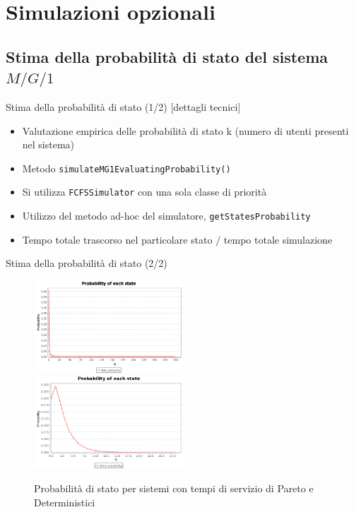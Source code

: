 \documentclass[slidestop,compress,mathserif]{beamer}
\begin{document}
\section{Simulazioni opzionali}
\subsection{Stima della probabilit\`a di stato del sistema $M/G/1$}
\begin{frame}{Stima della probabilit\`a di stato (1/2) [dettagli tecnici]}
\vfill
\begin{itemize}
	\item Valutazione empirica delle probabilit\`a di stato k (numero di utenti presenti nel sistema)
	\item Metodo {\tt simulateMG1EvaluatingProbability()}
	\item Si utilizza {\tt FCFSSimulator} con una sola classe di priorit\`a
	\item Utilizzo del metodo ad-hoc del simulatore, {\tt getStatesProbability}
	\item Tempo totale trascorso nel particolare stato $/$ tempo totale simulazione
\end{itemize}
\vfill
\end{frame}

\begin{frame}{Stima della probabilit\`a di stato (2/2)}
\begin{figure}[!h]{
	\begin{center}
	   \includegraphics[width=0.5\textwidth]{figures/statepareto.png}
	   \includegraphics[width=0.5\textwidth]{figures/mg1k.png}
	\end{center}}
	\caption{Probabilit\`a di stato per sistemi con tempi di servizio di Pareto e Deterministici}
	\label{fig:random}
\end{figure}
\end{frame}
\end{document}
